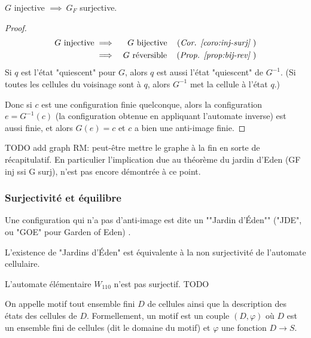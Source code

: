 \begin{coro}
	$G$ injective $\implies \ G_F$ surjective.
\end{coro}


\begin{proof}
	\begin{eqnarray*}
		G \text{ injective} &\implies& G \text{ bijective} \quad\left(\textit{Cor. \ref{coro:inj-surj} }\right)\\
		&\implies& G \text{ réversible} \quad\left(\textit{Prop. \ref{prop:bij-rev} }\right)
	\end{eqnarray*}
	Si $q$ est l'état "quiescent" pour $G$, alors $q$ est aussi l'état "quiescent" de $G^{-1}$.
	(Si toutes les cellules du voisinage sont à $q$, alors $G^{-1}$ met la cellule à l'état $q$.)

	Donc si $c$ est une configuration finie quelconque,  alors la configuration $e = G^{-1}(c)$ (la configuration obtenue en appliquant
	l'automate inverse) est aussi finie, et alors $G(e) = c$ et $c$ a bien une anti-image finie.
\end{proof}

TODO add graph
RM: peut-être mettre le graphe à la fin en sorte de récapitulatif. En particulier l'implication due au  théorème du jardin
d'Eden (GF inj ssi  G surj), n'est pas encore démontrée à ce point.


\subsubsection{Surjectivité et équilibre}
\begin{definition}
	Une configuration qui n'a pas d'anti-image est dite un ""Jardin d'Éden"" ("JDE", ou "GOE" pour Garden of Eden) .
\end{definition}

\begin{remarque}
	L'existence de "Jardins d'Éden" est équivalente à la non surjectivité de l'automate cellulaire.
\end{remarque}

\begin{exemple}
	L'automate élémentaire $W_{110}$ n'est pas surjectif. TODO
\end{exemple}


\begin{definition}
	On appelle motif tout ensemble fini $D$ de cellules ainsi que la description des états des cellules de $D$. Formellement, un motif est un
	couple $(D, \varphi)$ où $D$ est un ensemble fini de cellules (dit le domaine du motif) et $\varphi$ une fonction $D \to S$.
\end{definition}



